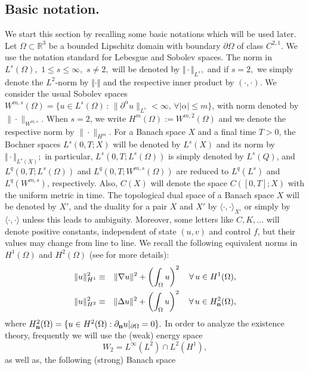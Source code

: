 \documentclass[11pt,reqno]{amsart}%
\numberwithin{equation}{section}
\begin{document}
\subsection{Basic notation.}
We start this section by recalling some basic notations which will be used later.
Let $\Omega\subset \mathbb{R}^3$ be a bounded Lipschitz domain with boundary $\partial\Omega$ of class $C^{2,1}$. 
 We use the notation standard for Lebesgue and Sobolev spaces. The norm in $L^s(\Omega),$ $1\leq s\leq \infty,$ $s\neq 2,$ will be denoted by $\Vert \cdot\Vert_{L^s},$ and if $s=2,$ we simply denote the $L^2$-norm by $\Vert\cdot\Vert$ and the respective inner product by $(\cdot,\cdot)$. We consider the usual Sobolev spaces $W^{m,s}(\Omega)=\{u\in L^s(\Omega)\,:\, \|\partial^\alpha u\|_{L^s}<\infty,\, \forall |\alpha|\le m\}$, with norm denoted by $\|\cdot\|_{W^{m,s}}.$ When $s=2$, we write $H^m(\Omega):=W^{m,2}(\Omega)$ and we denote the respective norm by $\|\cdot\|_{H^m}.$ For a Banach space $X$ and a final time $T>0$, the Bochner spaces $L^s(0,T;X)$ will be denoted by $L^s(X)$ and its norm by $\Vert \cdot \Vert_{L^s(X)};$ in particular, $L^s(0,T;L^s(\Omega))$ is simply denoted by $L^s(Q)$, and $L^q(0,T;L^s(\Omega))$  and $L^q(0,T;W^{m,s}(\Omega))$ are reduced to $L^q(L^s)$ and $L^q(W^{m,s})$, respectively.  Also, $C(X)$ will denote the space $C([0,T];X)$ with the uniform metric in time. %
The topological dual space of a Banach space $X$ will be denoted by $X'$, and the duality for a pair $X$ and $X'$ by $\langle\cdot,\cdot\rangle_{X'}$ or simply by $\langle\cdot,\cdot\rangle$ unless this leads to ambiguity. Moreover, some letters like $C,K,...$ will denote 
positive constants, independent of state $(u,v)$ and control $f$, but their values may change from line to line. 
We recall the following equivalent norms in $H^1(\Omega)$ and $H^2(\Omega)$
(see \cite{necas} for more details):
\begin{eqnarray}
\|u\|^2_{H^1}&\equiv& \|\nabla u\|^2+\left(\int_\Omega u\right)^2\quad \forall \,u\in H^1(\Omega),\label{norm-1}\\
\|u\|^2_{H^2}&\equiv& \|\Delta u\|^2+\left(\int_\Omega u\right)^2\quad \forall \, u\in H^2_{\bf n}(\Omega),\label{norm-2}
\end{eqnarray}
where $H^2_{\bf n}(\Omega)=\{u\in H^2(\Omega): \partial_{\bf n} u\vert_{\partial\Omega}=0\}.$ In order to analyze the existence theory, frequently we will
use the (weak) energy space
$$W_2=L ^\infty(L^2)\cap L^2(H^1),$$
as well as, the following (strong) Banach space
\end{document}
